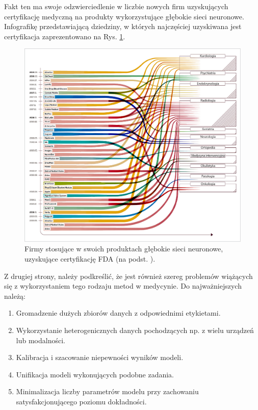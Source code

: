 Fakt ten ma swoje odzwierciedlenie w liczbie nowych firm uzyskujących certyfikację medyczną na produkty wykorzystujące głębokie sieci neuronowe. Infografikę przedstawiającą dziedziny, w których najczęściej uzyskiwana jest certyfikacja zaprezentowano na Rys. \ref{fda_cert}.

\begin{figure}[b!]
	\centering
	\includegraphics[width=1\textwidth]{figures/fda_for_ai.jpg}
	\caption{Firmy stosujące w swoich produktach głębokie sieci neuronowe, uzyskujące certyfikację FDA (na podst. \cite{FDA}).}
	\label{fda_cert}
\end{figure}

Z drugiej strony, należy podkreślić, że jest również szereg problemów wiążących się z wykorzystaniem tego rodzaju metod w medycynie. Do najważniejszych należą:
\begin{enumerate}
	\item Gromadzenie dużych zbiorów danych z odpowiednimi etykietami.
	\item Wykorzystanie heterogenicznych danych pochodzących np. z wielu urządzeń lub modalności.
	\item Kalibracja i szacowanie niepewności wyników modeli.
	\item Unifikacja modeli wykonujących podobne zadania.
	\item Minimalizacja liczby parametrów modelu przy zachowaniu satysfakcjonującego poziomu dokładności.
\end{enumerate}

